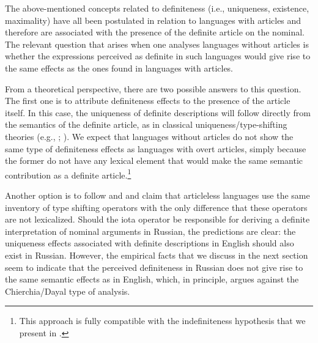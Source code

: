 \documentclass[output=paper,
colorlinks,
citecolor=brown,
newtxmath
]{langscibook}
\begin{document}

The above-mentioned concepts related to definiteness (i.e., uniqueness, existence, maximality) have all been postulated in relation to languages with articles and therefore are associated with the presence of the definite article on the nominal. The relevant question that arises when one analyses languages without articles is whether the expressions perceived as definite in such languages would give rise to the same effects as the ones found in languages with articles.

From a theoretical perspective, there are two possible answers to this question. The first one is to attribute definiteness effects to the presence of the article itself. In this case, the uniqueness of definite descriptions will follow directly from the semantics of the definite article, as in classical uniqueness/type-shifting theories (e.g., \citealt{Frege1892}; \citealt{Partee1987}). We expect that languages without articles do not show the same type of definiteness effects as languages with overt articles, simply because the former do not have any lexical element that would make the same semantic contribution as a definite article.\footnote{This approach is fully compatible with the indefiniteness hypothesis that we present in .}

Another option is to follow \citet{Chierchia1998} and \citet{Dayal2004} and claim that articleless languages use the same inventory of type shifting operators with the only difference that these operators are not lexicalized. Should the iota operator be responsible for deriving a definite interpretation of nominal arguments in Russian, the predictions are clear: the uniqueness effects associated with definite descriptions in English should also exist in Russian. However, the empirical facts that we discuss in the next section seem to indicate that the perceived definiteness in Russian does not give rise to the same semantic effects as in English, which, in principle, argues against the Chierchia/Dayal type of analysis.



\end{document}
